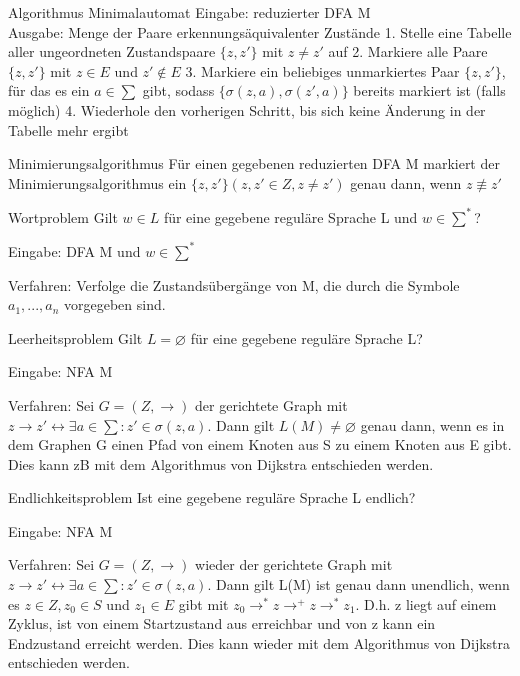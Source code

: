 \documentclass[avery5371]{flashcards}
\begin{document}
\begin{flashcard}{Algorithmus Minimalautomat}
Eingabe: reduzierter DFA M\\
Ausgabe: Menge der Paare erkennungsäquivalenter Zustände
1. Stelle eine Tabelle aller ungeordneten Zustandspaare $\{z,z'\}$ mit $z\not = z'$ auf
2. Markiere alle Paare $\{z,z'\}$ mit $z\in E$ und $z'\not\in E$
3. Markiere ein beliebiges unmarkiertes Paar $\{z,z'\}$, für das es ein $a\in\sum$ gibt, sodass $\{\sigma(z,a),\sigma(z',a)\}$ bereits markiert ist (falls möglich)
4. Wiederhole den vorherigen Schritt, bis sich keine Änderung in der Tabelle mehr ergibt
\end{flashcard}

\begin{flashcard}[Satz]{Minimierungsalgorithmus} Für einen gegebenen reduzierten DFA M markiert der Minimierungsalgorithmus ein $\{z,z'\}(z,z'\in Z, z\not=z')$ genau dann, wenn $z\not\equiv z'$
\end{flashcard}


\begin{flashcard}{Wortproblem}
Gilt $w\in L$ für eine gegebene reguläre Sprache L und $w\in\sum^*$?

Eingabe: DFA M und $w\in\sum^*$

Verfahren: Verfolge die Zustandsübergänge von M, die durch die Symbole $a_1,...,a_n$ vorgegeben sind.
\end{flashcard}


\begin{flashcard}{Leerheitsproblem}
Gilt $L=\varnothing$ für eine gegebene reguläre Sprache L?

Eingabe: NFA M

Verfahren: Sei $G=(Z,\rightarrow)$ der gerichtete Graph mit $z\rightarrow z' \leftrightarrow \exists a \in \sum: z'\in\sigma(z,a)$. Dann gilt $L(M)\not =\varnothing$ genau dann, wenn es in dem Graphen G einen Pfad von einem Knoten aus S zu einem Knoten aus E gibt. Dies kann zB mit dem Algorithmus von Dijkstra entschieden werden.
\end{flashcard}

\begin{flashcard}{Endlichkeitsproblem}
Ist eine gegebene reguläre Sprache L endlich?

Eingabe: NFA M

Verfahren: Sei $G=(Z,\rightarrow)$ wieder der gerichtete Graph mit $z\rightarrow z' \leftrightarrow \exists a \in\sum:z'\in\sigma(z,a)$. Dann gilt L(M) ist genau dann unendlich, wenn es $z\in Z,z_0\in S$ und $z_1\in E$ gibt mit $z_0\rightarrow^* z \rightarrow^+ z \rightarrow^* z_1$. D.h. z liegt auf einem Zyklus, ist von einem Startzustand aus erreichbar und von z kann ein Endzustand erreicht werden. Dies kann wieder mit dem Algorithmus von Dijkstra entschieden werden.
\end{flashcard}
\end{document}
